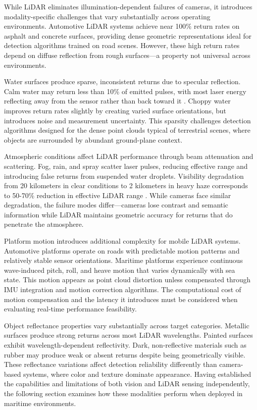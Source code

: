 \documentclass[../main.tex]{subfiles}
\begin{document}
While LiDAR eliminates illumination-dependent failures of cameras, it introduces modality-specific challenges that vary substantially across operating environments. Automotive LiDAR systems achieve near 100\% return rates on asphalt and concrete surfaces, providing dense geometric representations ideal for detection algorithms trained on road scenes. However, these high return rates depend on diffuse reflection from rough surfaces—a property not universal across environments.

Water surfaces produce sparse, inconsistent returns due to specular reflection. Calm water may return less than 10\% of emitted pulses, with most laser energy reflecting away from the sensor rather than back toward it \cite{kunz2005, thompson2019}. Choppy water improves return rates slightly by creating varied surface orientations, but introduces noise and measurement uncertainty. This sparsity challenges detection algorithms designed for the dense point clouds typical of terrestrial scenes, where objects are surrounded by abundant ground-plane context.

Atmospheric conditions affect LiDAR performance through beam attenuation and scattering. Fog, rain, and spray scatter laser pulses, reducing effective range and introducing false returns from suspended water droplets. Visibility degradation from 20 kilometers in clear conditions to 2 kilometers in heavy haze corresponds to 50-70\% reduction in effective LiDAR range \cite{roriz2022}. While cameras face similar degradation, the failure modes differ—cameras lose contrast and semantic information while LiDAR maintains geometric accuracy for returns that do penetrate the atmosphere.

Platform motion introduces additional complexity for mobile LiDAR systems. Automotive platforms operate on roads with predictable motion patterns and relatively stable sensor orientations. Maritime platforms experience continuous wave-induced pitch, roll, and heave motion that varies dynamically with sea state. This motion appears as point cloud distortion unless compensated through IMU integration and motion correction algorithms. The computational cost of motion compensation and the latency it introduces must be considered when evaluating real-time performance feasibility.

Object reflectance properties vary substantially across target categories. Metallic surfaces produce strong returns across most LiDAR wavelengths. Painted surfaces exhibit wavelength-dependent reflectivity. Dark, non-reflective materials such as rubber may produce weak or absent returns despite being geometrically visible. These reflectance variations affect detection reliability differently than camera-based systems, where color and texture dominate appearance. Having established the capabilities and limitations of both vision and LiDAR sensing independently, the following section examines how these modalities perform when deployed in maritime environments.
\end{document}
